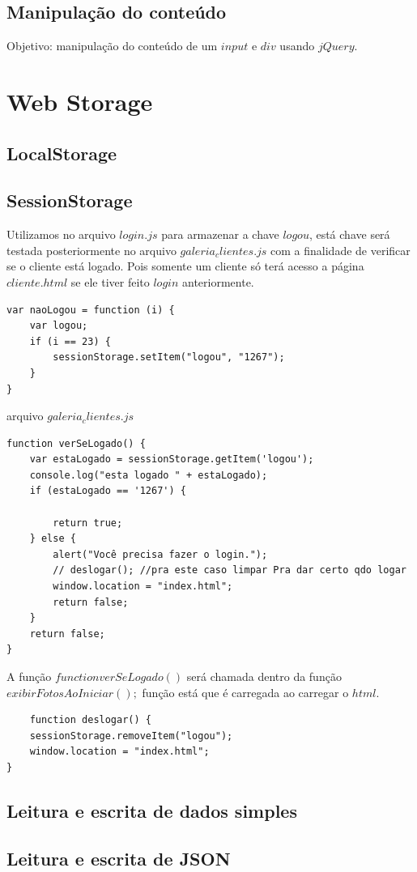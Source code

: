 \subsection{Manipulação do conteúdo}
	Objetivo: manipulação do conteúdo de um $input$ e $div$ usando $jQuery$.

\section{Web Storage }
\subsection{LocalStorage}

\subsection{SessionStorage}

	Utilizamos no arquivo $login.js$ para armazenar a chave $logou$, está chave será testada posteriormente no arquivo $galeria_clientes.js$ com a finalidade de verificar se o cliente está logado. Pois somente um cliente só terá acesso a página $cliente.html$ se ele tiver feito $login$ anteriormente. 
	
\begin{lstlisting}
var naoLogou = function (i) {
    var logou;
    if (i == 23) {
        sessionStorage.setItem("logou", "1267");
    }
}
\end{lstlisting}

arquivo $galeria_clientes.js$

\begin{lstlisting}
function verSeLogado() {
    var estaLogado = sessionStorage.getItem('logou');
    console.log("esta logado " + estaLogado);
    if (estaLogado == '1267') {

        return true;
    } else {
        alert("Você precisa fazer o login.");
        // deslogar(); //pra este caso limpar Pra dar certo qdo logar 
        window.location = "index.html";
        return false;
    }
    return false;
}
\end{lstlisting}

	A função $function verSeLogado()$ será chamada dentro da função $exibirFotosAoIniciar();$ função está que é carregada ao carregar o $html$.
	
\begin{lstlisting}
	function deslogar() {
    sessionStorage.removeItem("logou");
    window.location = "index.html";
}
\end{lstlisting}
\subsection{Leitura e escrita de dados simples}
\subsection{Leitura e escrita de JSON}
